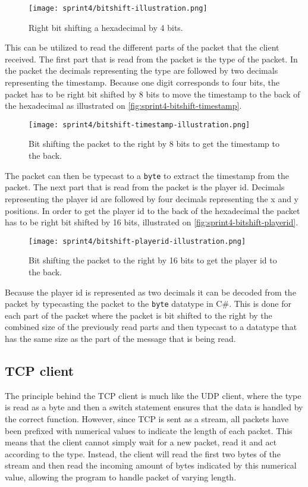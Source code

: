 \begin{figure}[H]
    \centering
    \texttt{[image: sprint4/bitshift-illustration.png]}
    \caption{Right bit shifting a hexadecimal by 4 bits.}
    \label{fig:sprint4-bit-shift-basic}
\end{figure}
\noindent
This can be utilized to read the different parts of the packet that the client received.
The first part that is read from the packet is the type of the packet.
In the packet the decimals representing the type are followed by two decimals representing the timestamp.
Because one digit corresponds to four bits, the packet has to be right bit shifted by 8 bits to move the timestamp to the back of the hexadecimal as illustrated on \autoref{fig:sprint4-bitshift-timestamp}.
\begin{figure}[H]
    \centering
    \texttt{[image: sprint4/bitshift-timestamp-illustration.png]}
    \caption{Bit shifting the packet to the right by 8 bits to get the timestamp to the back.}
    \label{fig:sprint4-bitshift-timestamp}
\end{figure}
\noindent
The packet can then be typecast to a \texttt{byte} to extract the timestamp from the packet.
The next part that is read from the packet is the player id.
Decimals representing the player id are followed by four decimals representing the x and y positions.
In order to get the player id to the back of the hexadecimal the packet has to be right bit shifted by 16 bits, illustrated on \autoref{fig:sprint4-bitshift-playerid}.
\begin{figure}[H]
    \centering
    \texttt{[image: sprint4/bitshift-playerid-illustration.png]}
    \caption{Bit shifting the packet to the right by 16 bits to get the player id to the back.}
    \label{fig:sprint4-bitshift-playerid}
\end{figure}
\noindent
Because the player id is represented as two decimals it can be decoded from the packet by typecasting the packet to the \texttt{byte} datatype in C\#.
This is done for each part of the packet where the packet is bit shifted to the right by the combined size of the previously read parts and then typecast to a datatype that has the same size as the part of the message that is being read.
\subsection*{TCP client}
The principle behind the TCP client is much like the UDP client, where the type is read as a byte and then a switch statement ensures that the data is handled by the correct function.
However, since TCP is sent as a stream, all packets have been prefixed with numerical values to indicate the length of each packet.
This means that the client cannot simply wait for a new packet, read it and act according to the type.
Instead, the client will read the first two bytes of the stream and then read the incoming amount of bytes indicated by this numerical value, allowing the program to handle packet of varying length.

